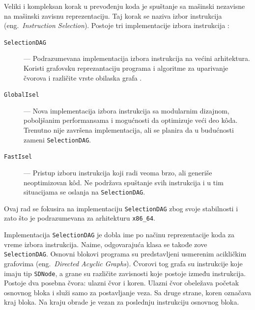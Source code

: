 \documentclass[12pt,oneside]{memoir}
\begin{document}
Veliki i kompleksan korak u prevođenju koda je spuštanje sa mašinski nezavisne na mašinski zavisnu reprezentaciju.
Taj korak se naziva izbor instrukcija (eng.~{\em Instruction Selection}).
Postoje tri implementacije izbora instrukcija \cite{nacke2021learn}:
\begin{description}
  \item[\texttt{SelectionDAG}] --- Podrazumevana implementacija izbora instrukcija na većini arhitektura. Koristi grafovsku reprezantaciju programa i algoritme za uparivanje čvorova i različite vrste obilaska grafa \cite{lopes2014llvmcorelibs}.
  \item[\texttt{GlobalIsel}] --- Nova implementacija izbora instrukcija sa modularnim dizajnom, poboljšanim performansama i mogućnosti da optimizuje veći deo k\^oda. Trenutno nije završena implementacija, ali se planira da u budućnosti zameni \verb|SelectionDAG|.
  \item[\texttt{FastIsel}] --- Pristup izboru instrukcija koji radi veoma brzo, ali generiše neoptimizovan k\^od. Ne podržava spuštanje svih instrukcija i u tim situacijama se oslanja na \verb|SelectionDAG|.
\end{description}
Ovaj rad se fokusira na implementaciju \verb|SelectionDAG| zbog svoje stabilnosti i zato što je podrazumevana za arhitekturu \verb|x86_64|.

Implementacija \verb|SelectionDAG| je dobla ime po načinu reprezentacije koda za vreme izbora instrukcija.
Naime, odgovarajuća klasa se takođe zove \verb|SelectionDAG|.
Osnovni blokovi programa su predstavljeni usmerenim acikličkim grafovima (eng.~{\em Directed Acyclic Graphs}).
Čvorovi tog grafa su instrukcije koje imaju tip \verb|SDNode|, a grane su različite zavisnosti koje postoje između instrukcija.
Postoje dva posebna čvora: ulazni čvor i koren.
Ulazni čvor obeležava početak osnovnog bloka i služi samo za postavljanje veza.
Sa druge strane, koren označava kraj bloka. Na kraju obrade je vezan za poslednju instrukciju osnovnog bloka.
\end{document}

